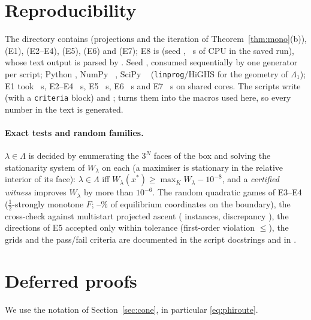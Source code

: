 \documentclass[11pt,a4paper]{article}
\theoremstyle{plain}
\theoremstyle{definition}
\theoremstyle{remark}
\newcommand{\Lam}{\Lambda}
\newcommand{\Lone}{\Lambda_{1}}
\begin{document}
\appendix
\section{Reproducibility}\label{app:repro}
{\sloppy The directory contains  (projections and the iteration of Theorem~\ref{thm:mono}(b)),  (E1),  (E2--E4),  (E5),  (E6) and  (E7); E8 is  (seed \RtSeed, \RtCPU~s of CPU in the saved run), whose text output is parsed by . Seed \MetaSeed, consumed sequentially by one generator per script; Python \MetaPython, NumPy \MetaNumpy~\citep{harris2020}, SciPy \MetaScipy~\citep{virtanen2020} (\texttt{linprog}/HiGHS for the geometry of $\Lone$); E1 took \MetaSecondsTraffic{}~s, E2--E4 \MetaSecondsWelfare{}~s, E5 \MetaSecondsCommodity{}~s, E6 \MetaSecondsHardness{}~s and E7 \MetaSecondsThree{}~s on shared cores. The scripts write  (with a \texttt{criteria} block) and ;  turns them into the macros used here, so every number in the text is generated.\par}

\paragraph{Exact tests and random families.} $\lambda\in\Lam$ is decided by enumerating the $3^N$ faces of the box and solving the stationarity system of $W_\lambda$ on each (a maximiser is stationary in the relative interior of its face): $\lambda\in\Lam$ iff $W_\lambda(x^*)\ge\max_KW_\lambda-10^{-8}$, and a \emph{certified witness} improves $W_\lambda$ by more than $10^{-6}$. The random quadratic games of E3--E4 ($\tfrac12$-strongly monotone $F$; \RndNFourCBdry--\RndNThreeXBdry\% of equilibrium coordinates on the boundary), the cross-check against multistart projected ascent (\RndPgaChecks{} instances, discrepancy \RndPgaDiff), the \CmRandTolDis{} directions of E5 accepted only within tolerance (first-order violation $\le$\CmRandTolDisViol), the grids and the pass/fail criteria are documented in the script docstrings and in .

\section{Deferred proofs}\label{app:routing}
We use the notation of Section~\ref{sec:cone}, in particular \eqref{eq:phiroute}.
\end{document}
